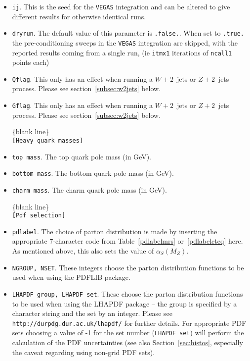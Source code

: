 \documentclass[12pt]{article}
\begin{document}
\begin{itemize}
\item {\tt ij}. This is the seed for the {\tt VEGAS} integration
and can be altered to give different results for otherwise identical
runs.

\item {\tt dryrun}. The default value of this parameter is
{\tt .false.}. When set to {\tt .true.} the pre-conditioning sweeps
in the {\tt VEGAS} integration are skipped, with the reported
results coming from a single run, (ie {\tt itmx1} iterations of 
{\tt ncall1} points each)
\item {\tt Qflag}. This only has an effect when running a
$W+2$~jets or $Z+2$~jets process. Please see section~\ref{subsec:w2jets}
below.

\item {\tt Gflag}. This only has an effect when running a
$W+2$~jets or $Z+2$~jets process. Please see section~\ref{subsec:w2jets}
below.

\begin{center}
\{blank line\} \\
{\tt [Heavy quark masses] }
\end{center}
\item {\tt top mass}. The top quark pole mass (in GeV).
\item {\tt bottom mass}. The bottom quark pole mass (in GeV).
\item {\tt charm mass}. The charm quark pole mass (in GeV).

\begin{center}
\{blank line\} \\
{\tt [Pdf selection] }
\end{center}

\item {\tt pdlabel}. The choice of parton distribution is made by
inserting the appropriate 7-character code from Table~\ref{pdlabelmrs}
or~\ref{pdlabelcteq} here.
As mentioned above, this also sets the value of $\alpha_S(M_Z)$.

\item {\tt NGROUP, NSET}. These integers choose the parton distribution
functions to be used when using the PDFLIB package.
\item {\tt LHAPDF group, LHAPDF set}. These choose the parton
distribution functions to be used when using the LHAPDF package --
the group is specified by a character string and the set by an integer.
Please see {\tt http://durpdg.dur.ac.uk/lhapdf/} for further details.
For appropriate PDF sets choosing a value of -1 for the set number ({\tt  LHAPDF set}) 
will perform the calculation of the PDF uncertainties (see also
Section~\ref{sec:histos}, especially the caveat regarding using
non-grid PDF sets).


\end{itemize}
\end{document}
